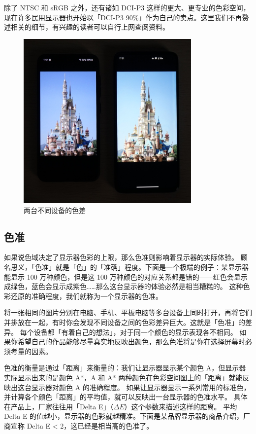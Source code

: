 除了 NTSC 和 sRGB 之外，还有诸如 DCI-P3 这样的更大、更专业的色彩空间，现在许多民用显示器也开始以「DCI-P3 90\%」作为自己的卖点。这里我们不再赘述相关的细节，有兴趣的读者可以自行上网查阅资料。

\begin{figure}[htb!]
  \centering
  \includegraphics[width=9cm]{assets/Colour_correctness.jpeg}
  \caption{两台不同设备的色差}
  \label{Off_Color}
\end{figure}

\subsection{色准}

如果说色域决定了显示器色彩的上限，那么色准则影响着显示器的实际体验。
顾名思义，「色准」就是「色」的「准确」程度。下面是一个极端的例子：某显示器能显示 100 万种颜色，但是这 100 万种颜色的对应关系都是错的——红色会显示成绿色，蓝色会显示成紫色……那么这台显示器的体验必然是相当糟糕的。
这种色彩还原的准确程度，我们就称为一个显示器的色准。

将一张相同的图片分别在电脑、手机、平板电脑等多台设备上同时打开，再将它们并排放在一起，有时你会发现不同设备之间的色彩差异巨大。这就是「色准」的差异。
每个设备都「有着自己的想法」，对于同一个颜色的显示表现各不相同。
如果你希望自己的作品能够尽量真实地反映出颜色，那么色准将是你在选择屏幕时必须考量的因素。

色准的衡量是通过「距离」来衡量的：我们让显示器显示某个颜色 A，但显示器实际显示出来的是颜色 A*，A 和 A* 两种颜色在色彩空间图上的「距离」就能反映出这台显示器对颜色 A 的准确程度。
如果让显示器显示一系列常用的标准色，并计算各个颜色「距离」的平均值，就可以反映出一台显示器的色准水平。
具体在产品上，厂家往往用「Delta E」（$\Delta E$）这个参数来描述这样的距离。
平均 Delta E 的值越小，显示器的色彩就越精准。下面是某品牌显示器的商品介绍，厂商宣称 Delta E < 2，这已经是相当高的色准了。

